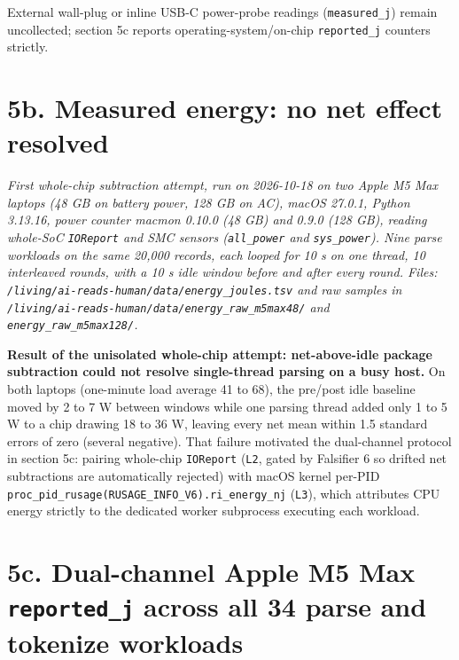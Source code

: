 \documentclass[10pt,letterpaper]{article}
\begin{document}
External wall-plug or inline USB-C power-probe readings
(\texttt{measured\_j}) remain uncollected; section 5c reports
operating-system/on-chip \texttt{reported\_j} counters strictly.

\section{5b. Measured energy: no net effect
resolved}\label{b.-measured-energy-no-net-effect-resolved}

\emph{First whole-chip subtraction attempt, run on 2026-10-18 on two
Apple M5 Max laptops (48 GB on battery power, 128 GB on AC), macOS
27.0.1, Python 3.13.16, power counter macmon 0.10.0 (48 GB) and 0.9.0
(128 GB), reading whole-SoC \texttt{IOReport} and SMC sensors
(\texttt{all\_power} and \texttt{sys\_power}). Nine parse workloads on
the same 20,000 records, each looped for 10 s on one thread, 10
interleaved rounds, with a 10 s idle window before and after every
round. Files: \texttt{/\allowbreak{}living/\allowbreak{}ai-\allowbreak{}reads-\allowbreak{}human/\allowbreak{}data/\allowbreak{}energy\_\allowbreak{}joules.\allowbreak{}tsv}
and raw samples in
\texttt{/\allowbreak{}living/\allowbreak{}ai-\allowbreak{}reads-\allowbreak{}human/\allowbreak{}data/\allowbreak{}energy\_\allowbreak{}raw\_\allowbreak{}m5max48/\allowbreak{}} and
\texttt{energy\_\allowbreak{}raw\_\allowbreak{}m5max128/\allowbreak{}}.}

\textbf{Result of the unisolated whole-chip attempt: net-above-idle
package subtraction could not resolve single-thread parsing on a busy
host.} On both laptops (one-minute load average 41 to 68), the pre/post
idle baseline moved by 2 to 7 W between windows while one parsing thread
added only 1 to 5 W to a chip drawing 18 to 36 W, leaving every net mean
within 1.5 standard errors of zero (several negative). That failure
motivated the dual-channel protocol in section 5c: pairing whole-chip
\texttt{IOReport} (\texttt{L2}, gated by Falsifier 6 so drifted net
subtractions are automatically rejected) with macOS kernel per-PID
\texttt{proc\_\allowbreak{}pid\_\allowbreak{}rusage(\allowbreak{}RUSAGE\_\allowbreak{}INFO\_\allowbreak{}V6).\allowbreak{}ri\_\allowbreak{}energy\_\allowbreak{}nj}
(\texttt{L3}), which attributes CPU energy strictly to the dedicated
worker subprocess executing each workload.

\section{\texorpdfstring{5c. Dual-channel Apple M5 Max
\texttt{reported\_j} across all 34 parse and tokenize
workloads}{5c. Dual-channel Apple M5 Max reported\_j across all 34 parse and tokenize workloads}}\label{c.-dual-channel-apple-m5-max-reported_j-across-all-34-parse-and-tokenize-workloads}
\end{document}
